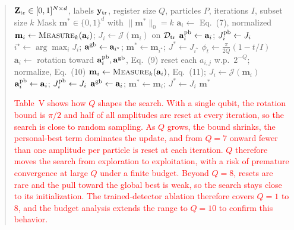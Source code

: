 \documentclass[11pt]{article}
\newenvironment{excerpt}{\begin{quote}\sloppy}{\end{quote}}
\begin{document}
\begin{excerpt}
\setcounter{algorithm}{0}
\begin{algorithm}[H]
\caption{\textcolor{red}{Variable-qubit QPSO feature
selection. Steps commented with Q are the only ones that depend on
the register size.}}

\color{red}
\small
\begin{algorithmic}[1]
\Require $\mathbf{Z}_{\rm tr}\in[0,1]^{N\times d}$, labels $\mathbf{y}_{\rm tr}$, register size $Q$, particles $P$, iterations $I$, subset size $k$
\Ensure Mask $\mathbf{m}^{*}\in\{0,1\}^{d}$ with $\|\mathbf{m}^{*}\|_0=k$
  \State $\mathbf{a}_i\gets$ Eq.~(7), normalized 
  \State $\mathbf{m}_i\gets\textsc{Measure}_k(\mathbf{a}_i)$; $J_i\gets\mathcal{J}(\mathbf{m}_i)$ on $\mathcal{D}_{\rm tr}$
  \State $\mathbf{a}_i^{\rm pb}\gets\mathbf{a}_i$; $J_i^{\rm pb}\gets J_i$
\EndFor
\State $i^{\star}\gets\arg\max_i J_i$; $\mathbf{a}^{\rm gb}\gets\mathbf{a}_{i^{\star}}$; $\mathbf{m}^{*}\gets\mathbf{m}_{i^{\star}}$; $J^{*}\gets J_{i^{\star}}$
  \State $\phi_t\gets\frac{\pi}{2Q}(1-t/I)$ 
    \State $\mathbf{a}_i\gets$ rotation toward $\mathbf{a}_i^{\rm pb},\mathbf{a}^{\rm gb}$, Eq.~(9)
    \State reset each $a_{i,j}$ w.p.\ $2^{-Q}$; normalize, Eq.~(10) 
    \State $\mathbf{m}_i\gets\textsc{Measure}_k(\mathbf{a}_i)$, Eq.~(11); $J_i\gets\mathcal{J}(\mathbf{m}_i)$
      \State $\mathbf{a}_i^{\rm pb}\gets\mathbf{a}_i$; $J_i^{\rm pb}\gets J_i$
    \EndIf
      \State $\mathbf{a}^{\rm gb}\gets\mathbf{a}_i$; $\mathbf{m}^{*}\gets\mathbf{m}_i$; $J^{*}\gets J_i$
    \EndIf
  \EndFor
\EndFor
\State \Return $\mathbf{m}^{*}$ 
\end{algorithmic}
\end{algorithm}

\textcolor{red}{Table~V shows
how $Q$ shapes the search. With a single qubit, the rotation bound is
$\pi/2$ and half of all amplitudes are reset at every iteration, so
the search is close to random sampling. As $Q$ grows, the bound
shrinks, the personal-best term dominates the update, and from $Q=7$
onward fewer than one amplitude per particle is reset at each
iteration. $Q$ therefore
moves the search from exploration to exploitation, with a risk of
premature convergence at large $Q$ under a finite budget. Beyond
$Q=8$, resets are rare and the pull toward the global best is weak,
so the search stays close to its initialization. The trained-detector
ablation therefore covers $Q=1$ to $8$, and the budget analysis
extends the range to $Q=10$ to confirm this behavior.}


\end{excerpt}
\end{document}
